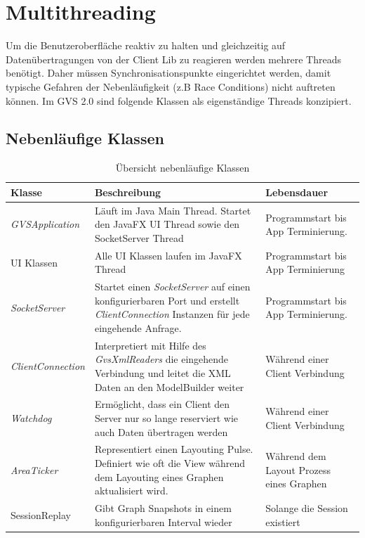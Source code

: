 \documentclass[11pt,a4paper,english,oneside]{book}
\numberwithin{equation}{chapter}
\begin{document}
		\section{Multithreading} \label{sec:threading}
	Um die Benutzeroberfläche reaktiv zu halten und gleichzeitig auf Datenübertragungen von der Client Lib zu reagieren werden mehrere Threads benötigt. Daher müssen Synchronisationspunkte eingerichtet werden, damit typische Gefahren der Nebenläufigkeit (z.B Race Conditions) nicht auftreten können. Im GVS 2.0 sind folgende Klassen als eigenständige Threads konzipiert.
	
	\subsection{Nebenläufige Klassen}
	
	\begin{table}[h!]
		\centering
		\begin{tabularx}{\linewidth}{l X X}
			\toprule 
			Klasse & Beschreibung & Lebensdauer \\
			\midrule
			\textit{GVSApplication} & Läuft im Java Main Thread. Startet den JavaFX UI Thread sowie den SocketServer Thread & Programmstart bis App Terminierung. \\
			UI Klassen & Alle UI Klassen laufen im JavaFX Thread & Programmstart bis App Terminierung \\
			\textit{SocketServer} & Startet einen \textit{SocketServer} auf einen konfigurierbaren Port und erstellt \textit{ClientConnection} Instanzen für jede eingehende Anfrage. & Programmstart bis App Terminierung. \\
			\textit{ClientConnection} & Interpretiert mit Hilfe des \textit{GvsXmlReaders} die eingehende Verbindung und leitet die XML Daten an den ModelBuilder weiter & Während einer Client Verbindung \\
			\textit{Watchdog} & Ermöglicht, dass ein Client den Server nur so lange reserviert wie auch Daten übertragen werden & Während einer Client Verbindung \\
			\textit{AreaTicker} & Representiert einen Layouting Pulse. Definiert wie oft die View während dem Layouting eines Graphen aktualisiert wird. & Während dem Layout Prozess eines Graphen \\
			SessionReplay & Gibt Graph Snapshots in einem konfigurierbaren Interval wieder & Solange die Session existiert \\
			\bottomrule 
		\end{tabularx} 
		\caption{Übersicht nebenläufige Klassen} 
		\label{tbl:concurrent-classes}
	\end{table}
	
\end{document}
